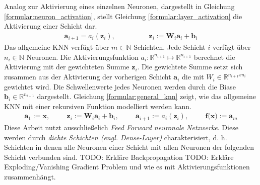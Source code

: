Analog zur Aktivierung eines einzelnen Neuronen, dargestellt in Gleichung \ref{formular:neuron_activation}, stellt Gleichung \ref{formular:layer_activation} die Aktivierung einer Schicht dar.
\begin{align}
    \label{formular:layer_activation}
    \textbf{a}_{i+1} = a_i(\textbf{z}_i), \hspace{2cm} \textbf{z}_i := \textbf{W}_i\textbf{a}_i + \textbf{b}_i
\end{align}
Das allgemeine KNN verfügt über $m\in\mathbb{N}$ Schichten. Jede Schicht $i$ verfügt über $n_i\in\mathbb{N}$ Neuronen.
Die Aktivierungsfunktion $a_i:\mathbb{R}^{n_{i+1}}\mapsto\mathbb{R}^{n_{i+1}}$ berechnet die Aktivierung mit der gewichteten Summe $\textbf{z}_i$.
Die gewichtete Summe setzt sich zusammen aus der Aktivierung der vorherigen Schicht $\textbf{a}_i$ die mit $W_i\in\mathbb{R}^{n_{i+1}x{n_{i}}}$ gewichtet wird.
Die Schwellenwerte jedes Neuronen werden durch die Biase $\textbf{b}_i\in\mathbb{R}^{n_{i+1}}$ dargestellt.
Gleichung \ref{formular:general_knn} zeigt, wie das allgemeine KNN mit einer rekursiven Funktion modelliert werden kann.
\begin{align}
    \label{formular:general_knn}
    \textbf{a}_1 := \textbf{x}, \hspace{1cm} \textbf{z}_i := \textbf{W}_i\textbf{a}_i + \textbf{b}_i, \hspace{1cm} \textbf{a}_{i+1} := a_i(\textbf{z}_i), \hspace{1cm} \textbf{f(x)} := \textbf{a}_m
\end{align}
Diese Arbeit nutzt ausschließelich \textit{Feed Forward neuronale Netzwerke}.
Diese werden durch \textit{dichte Schichten (engl. Dense-Layer)} charakterisiert, d. h. Schichten in denen alle Neuronen einer Schicht mit allen Neuronen der folgenden Schicht verbunden sind.
\newline
\newline
TODO: Erkläre Backpropagation
\newline
TODO: Erkläre Exploding/Vanishing Gradient Problem und wie es mit Aktivierungsfunktionen zusammenhängt.

